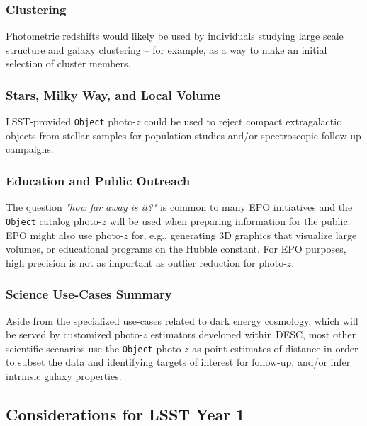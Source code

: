 \documentclass[DM,lsstdraft,toc]{lsstdoc}
\begin{document}
\subsubsection{Clustering}\label{sssec:use_sci_clust}
Photometric redshifts would likely be used by individuals studying large scale structure and galaxy clustering -- for example, as a way to make an initial selection of cluster members.

\subsubsection{Stars, Milky Way, and Local Volume}\label{sssec:use_sci_smwlv}
LSST-provided {\tt Object} photo-$z$ could be used to reject compact extragalactic objects from stellar samples for population studies and/or spectroscopic follow-up campaigns.

\subsubsection{Education and Public Outreach}\label{sssec:use_sci_epo}
The question {\it "how far away is it?"} is common to many EPO initiatives and the {\tt Object} catalog photo-$z$ will be used when preparing information for the public.
EPO might also use photo-$z$ for, e.g., generating 3D graphics that visualize large volumes, or educational programs on the Hubble constant.
For EPO purposes, high precision is not as important as outlier reduction for photo-$z$.


\subsubsection{Science Use-Cases Summary}\label{sssec:use_sci_sum}
Aside from the specialized use-cases related to dark energy cosmology, which will be served by customized photo-$z$ estimators developed within DESC, most other scientific scenarios use the {\tt Object} photo-$z$ as point estimates of distance in order to subset the data and identifying targets of interest for follow-up, and/or infer intrinsic galaxy properties.

\subsection{Considerations for LSST Year 1}\label{ssec:use_LOY1}
\end{document}
